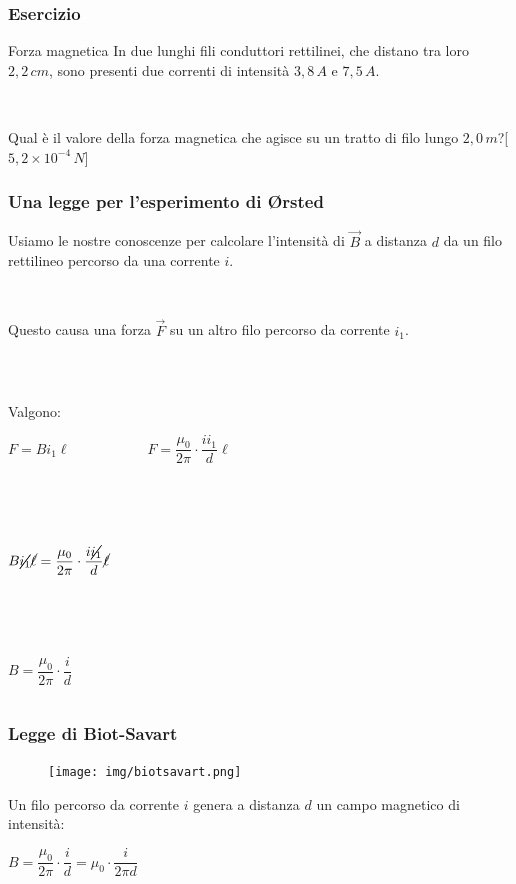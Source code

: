 \documentclass[]{beamer}
\theoremstyle{plain}
\begin{document}
\begin{frame}
\frametitle{Esercizio}
\begin{exampleblock}{Forza magnetica}
  In due lunghi fili conduttori rettilinei, che distano tra loro $ 2,2 \, cm $, sono presenti due correnti di intensità $ 3,8 \, A $ e $ 7,5 \, A $.

  ~

  Qual è il valore della forza magnetica che agisce su un tratto di filo lungo $ 2,0 \, m $?\hspace{\fill}[$ 5,2 \times 10^{-4} \, N $]
\end{exampleblock} 
\end{frame}


\begin{frame}
\frametitle{Una legge per l'esperimento di \O rsted}
Usiamo le nostre conoscenze per calcolare l'intensità di $ \vec{B} $ a distanza $ d $ da un filo rettilineo percorso da una corrente $ i $.\pause

~

Questo causa una forza $ \vec{F} $ su un altro filo percorso da corrente $ i_1 $. 

~

\begin{columns}
\begin{column}{0.5\textwidth}
Valgono:
\begin{center}
$ F = Bi_1\ell $~~~~~~~~~~~$ F = \dfrac{\mu_0}{2\pi} \cdot \dfrac{ii_1}{d}\ell $\pause

~

~

$ B\cancel{i_1}\cancel{\ell} = \dfrac{\mu_0}{2\pi} \cdot \dfrac{i\cancel{i_1}}{d}\cancel{\ell} $\pause

~

~

$ B = \dfrac{\mu_0}{2\pi} \cdot \dfrac{i}{d} $
\end{center}
\end{column}
\begin{column}{0.3\textwidth}
\end{column}
\end{columns}
\end{frame}






\begin{frame}
\frametitle{Legge di Biot-Savart}
\begin{figure}
\texttt{[image: img/biotsavart.png]}
\end{figure}
Un filo percorso da corrente $ i $ genera a distanza $ d $ un campo magnetico di intensità:
\begin{center}
\colorbox{blue!30}{$ B = \dfrac{\mu_0}{2\pi} \cdot \dfrac{i}{d} = \mu_0 \cdot \dfrac{i}{2\pi d} $}
\end{center}
\end{frame}
\end{document}

